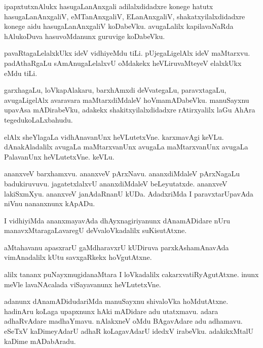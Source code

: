 \documentclass{article}
\begin{document}
\begin{mn}
ipapxtutxnAlukx  hasugaLanAnxgali  adilalxdidadxre konege  hatutx  hasugaLanAnxgaliV,  eMTanAnxgaliV,  
ELanAnxgaliV,  shakatxyilalxdidadxre  konege  aidu  hasugaLanAnxgaliV  koDabeVku.  avugaLalilx  
kapilavaNaRda  hAlukoDuva  hasuvoMdanunx  guruvige  koDabeVku.
\end{mn}

\begin{mn}
pavaRtagaLelalxkUkx  ideV  vidhiyeMdu  tiLi.  pUjegaLigelAlx  ideV  maMtarxvu.  padAthaRgaLu  
sAmAnugaLelalxvU  oMdakekx  heVLiruvaMteyeV  elalxkUkx  eMdu  tiLi.
\end{mn}

\begin{mn}
garxhagaLu,  loVkapAlakaru,  barxhAmxdi  deVvategaLu,  paravxtagaLu,  avugaLigelAlx  avaravara  
maMtarxdiMdaleV  hoVmamADabeVku.  manuSayxnu  upavAsa mADirabeVku,  adakekx  shakitxyilalxdidadxre  
rAtirxyalilx  laGu AhAra  tegedukoLaLxbahudu.
\end{mn}

\begin{mn}
elAlx  sheYlagaLa  vidhAnavanUnx  heVLutetxVne.  karxmavAgi  keVLu.  dAnakAladalilx  avugaLa  
maMtarxvanUnx  avugaLa  maMtarxvanUnx  avugaLa  PalavanUnx  heVLutetxVne.  keVLu.
\end{mn}

\begin{mn}
ananxveV  barxhamxvu.  ananxveV  pArxNavu.  ananxdiMdaleV  pArxNagaLu  badukiruvuvu.  
jagatetxlalxvU  ananxdiMdaleV  beLeyutatxde.  ananxveV  lakiSxmXyu.  ananxveV  
janAdaRnanU  kUDa.  AdadxriMda  I  paravxtarUpavAda  niVnu  nananxnunx  kApADu.
\end{mn}

\begin{mn}
I vidhiyiMda  ananxmayavAda  dhAyxnagiriyanunx  dAnamADidare  nUru  manavxMtaragaLavaregU  
deVvaloVkadalilx  suKisutAtxne.
\end{mn}

\begin{mn}
aMtahavanu  apasxrarU  gaMdharavxrU  kUDiruva  parxkAshamAnavAda  vimAnadalilx  
kUtu  savxgaRkekx  hoVgutAtxne.
\end{mn}

\begin{mn}
alilx  tananx  puNayxmugidanaMtara  I  loVkadalilx  cakarxvatiRyAgutAtxne.  inunx  
meVle  lavaNAcalada  viSayavanunx  heVLutetxVne.  
\end{mn}

\begin{mn}
adanunx  dAnamADidudariMda  manuSayxnu  shivaloVka  hoMdutAtxne.  hadinAru  koLaga  
upapxnunx  hAki  mADidare  adu  utatxmavu.  adara  adhaRvAdare  madhaYmavu.  nAlakxneV  
oMdu BAgavAdare  adu  adhamavu.  eSeTxV  kaDimeyAdarU  adhaR  koLagavAdarU  idedxV  
irabeVku.  adakikxMtalU  kaDime mADabAradu.
\end{mn}
\end{document}

